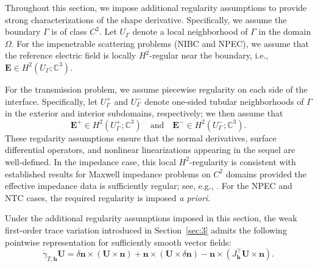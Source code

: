 \documentclass[12pt,reqno]{amsart}
\theoremstyle{definition}
\numberwithin{equation}{section}
\begin{document}
Throughout this section, we impose additional regularity assumptions to provide strong characterizations of the shape derivative. Specifically, we assume the boundary $\Gamma$ is of class $C^2$. Let $U_\Gamma$ denote a local neighborhood of $\Gamma$ in the domain $\Omega$. For the impenetrable scattering problems (NIBC and NPEC), we assume that the reference electric field is locally $H^2$-regular near the boundary, i.e., $\mathbf{E} \in H^2(U_\Gamma; \mathbb{C}^3)$.



For the transmission problem, we assume piecewise regularity on each side of the interface. Specifically, let $U_\Gamma^+$ and $U_\Gamma^-$ denote one-sided tubular neighborhoods of $\Gamma$ in the exterior and interior subdomains, respectively; we then assume that
\[
\mathbf{E}^+ \in H^2(U_\Gamma^+; \mathbb{C}^3) \quad \text{and} \quad \mathbf{E}^- \in H^2(U_\Gamma^-; \mathbb{C}^3).
\]
These regularity assumptions ensure that the normal derivatives, surface differential operators, and nonlinear linearizations appearing in the sequel are well-defined. In the impedance case, this local $H^2$-regularity is consistent with established results for Maxwell impedance problems on $C^2$ domains provided the effective impedance data is sufficiently regular; see, e.g., \cite{chen2025regularity}. For the NPEC and NTC cases, the required regularity is imposed \textit{a priori}.

Under the additional regularity assumptions imposed in this section, the weak
first-order trace variation introduced in Section~\ref{sec:3} admits the
following pointwise representation for sufficiently smooth vector fields:
\begin{equation}\label{eq:trace variation}
\dot{\gamma}_{T,\mathbf h}\mathbf U
=
\delta\mathbf n\times(\mathbf U\times\mathbf n)
+
\mathbf n\times(\mathbf U\times\delta\mathbf n)
-
\mathbf n\times(J_{\mathbf h}^{\top}\mathbf U\times\mathbf n).
\end{equation}
\end{document}
